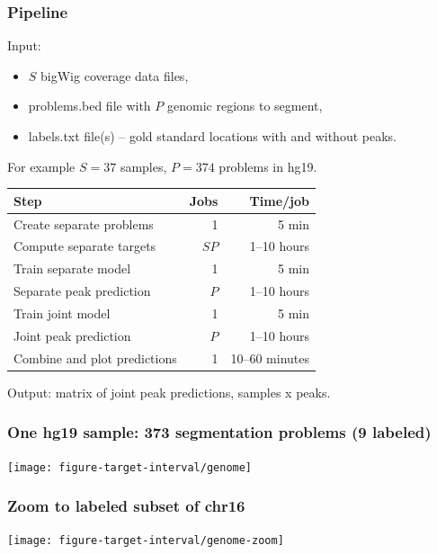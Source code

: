 \documentclass{beamer}
\begin{document}

\begin{frame}
  \frametitle{Pipeline}
Input:
\begin{itemize}
\item $S$ bigWig coverage data files, 
\item problems.bed file with $P$ genomic regions to segment, 
\item labels.txt file(s) -- gold standard locations with and without peaks.
\end{itemize}
For example $S=37$ samples, $P=374$ problems in hg19.
\vskip 0.2cm
  \begin{tabular}{lrr}
    Step& Jobs& Time/job \\
    \hline
    Create separate problems & 1 & 5 min\\
    Compute separate targets & $S P$ & 1--10 hours\\
    Train separate model & 1 & 5 min \\
    Separate peak prediction & $P$ & 1--10 hours\\
    Train joint model & 1 & 5 min \\
    Joint peak prediction & $P$ & 1--10 hours\\
    Combine and plot predictions & 1 & 10--60 minutes
  \end{tabular}
\vskip 0.2cm
Output: matrix of joint peak predictions, samples x peaks.
\end{frame}



\begin{frame}
  \frametitle{One hg19 sample: 373 segmentation problems (9 labeled)}
  \texttt{[image: figure-target-interval/genome]} 
\end{frame}

\begin{frame}
  \frametitle{Zoom to labeled subset of chr16}
  \texttt{[image: figure-target-interval/genome-zoom]} 
\end{frame}
\end{document}
